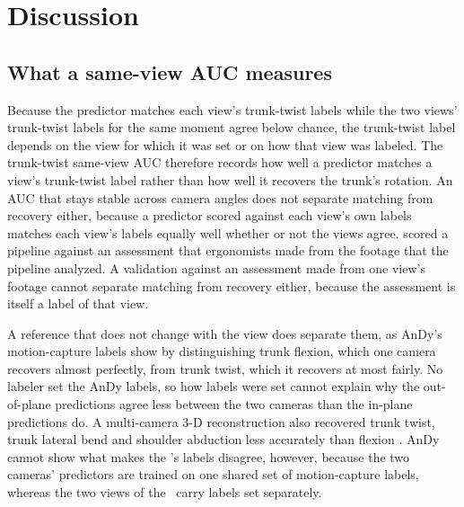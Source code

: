 \documentclass[review,3p,authoryear]{elsarticle}
\begin{document}
\section{Discussion}
\label{sec:discussion}

\subsection{What a same-view AUC measures}
\label{sec:meaning}

Because the predictor matches each view's trunk-twist labels while the two views'
trunk-twist labels for the same moment agree below chance, the trunk-twist label depends on
the view for which it was set or on how that view was labeled. The trunk-twist same-view
AUC therefore records how well a predictor matches a view's trunk-twist label rather than
how well it recovers the trunk's rotation. An AUC that stays stable across camera angles does not separate matching
from recovery either, because a predictor scored against each view's own labels matches
each view's labels equally well whether or not the views agree. \citet{agostinelli2024validation} scored a pipeline against an assessment that ergonomists
made from the footage that the pipeline analyzed. A validation against an assessment made
from one view's footage cannot separate matching from recovery either, because the
assessment is itself a label of that view.

A reference that does not change with the view does separate them, as AnDy's motion-capture labels show by distinguishing trunk flexion, which one camera recovers almost
perfectly, from trunk twist, which it recovers at most fairly. No labeler set the AnDy
labels, so how labels were set cannot explain why the out-of-plane predictions agree less
between the two cameras than the in-plane predictions do. A multi-camera 3-D reconstruction
also recovered trunk twist, trunk lateral bend and shoulder abduction less accurately than
flexion \citep{vancrombrugge2022jointangles}. AnDy cannot show what makes the \datasetName's
labels disagree, however, because the two cameras' predictors are trained on one shared set of
motion-capture labels, whereas the two views of the \datasetName\ carry labels set separately.
\end{document}
